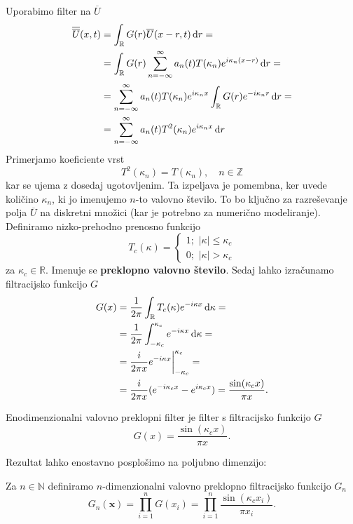 \documentclass[mat2, tisk]{fmfdelo}
\newcommand{\R}{\mathbb R}
\newcommand{\N}{\mathbb N}
\newcommand{\Z}{\mathbb Z}
\newcommand{\bd}{\textbf}
\begin{document}
\noindent
Uporabimo filter na $\overline{U}$
\begin{align*}
\overline{\overline{U}}(x, t) &= \int_\R G(r) \overline{U}(x-r, t) \dif r = \\
&= \int_\R G(r) \sum_{n=-\infty}^\infty a_n(t) T(\kappa_n) e^{i\kappa_n (x - r)} \dif r= \\
&= \sum_{n=-\infty}^\infty a_n(t)T(\kappa_n) e^{i\kappa_n x} \int_\R G(r)e^{-i\kappa_n r} \dif r = \\
&= \sum_{n=-\infty}^\infty a_n(t)T^2(\kappa_n) e^{i\kappa_n x} \dif r
\end{align*}
Primerjamo koeficiente vrst
$$
T^2(\kappa_n) = T(\kappa_n), \quad n\in \Z
$$
kar se ujema z dosedaj ugotovljenim. Ta izpeljava je pomembna, ker uvede količino 
$\kappa_n$, ki jo imenujemo $n$-to valovno število. To bo ključno za razreševanje 
polja $\overline{U}$ na diskretni množici (kar je potrebno za numerično modeliranje).
Definiramo nizko-prehodno prenosno funkcijo
$$
T_c(\kappa)=\left\{\begin{array}{l}
  1 ;\,\, |\kappa| \leq \kappa_c \\
  0 ;\,\, |\kappa| > \kappa_c
\end{array}\right.
$$
za $\kappa_c \in \R$. Imenuje se \textbf{preklopno valovno število}. Sedaj lahko izračunamo 
filtracijsko funkcijo $G$
\begin{align*}
G(x) &= \frac{1}{2\pi} \int_\R T_c(\kappa) e^{-i\kappa x} \dif \kappa = \\
&= \frac{1}{2\pi} \int_{-\kappa_c}^{\kappa_c} e^{-i\kappa x} \dif \kappa = \\ 
&= \frac{i}{2\pi x} e^{-i\kappa x}\Big|_{-\kappa_c}^{\kappa_c} = \\
&= \frac{i}{2\pi x} (e^{-i\kappa_c x} - e^{i\kappa_c x}) = \frac{\sin(\kappa_c x)}{\pi x}.
\end{align*} 

\begin{definicija}
Enodimenzionalni valovno preklopni filter je filter s filtracijsko funkcijo $G$
\begin{equation}
G(x) = \frac{\sin(\kappa_c x)}{\pi x}.
\end{equation}
\end{definicija}
\noindent
Rezultat lahko enostavno posplošimo na poljubno dimenzijo:
\begin{definicija}
Za $n\in \N$ definiramo $n$-dimenzionalni valovno preklopno filtracijsko 
funkcijo $G_n$
\begin{equation}
G_n(\bd{x}) = \prod_{i=1}^n G(x_i) =\prod_{i=1}^n \frac{\sin(\kappa_c x_i)}{\pi x_i}.
\end{equation} 
\end{definicija}
\end{document}
